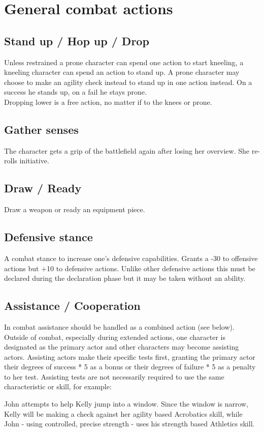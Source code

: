 \documentclass[12pt,a4paper,openany]{book}
\newenvironment{exampleblock}[1][1]
{\hfill\begin{minipage}{\dimexpr\textwidth-#1cm}}
{\end{minipage}\par}
\begin{document}
	\newpage
	\section{General combat actions}
	\subsection*{Stand up / Hop up / Drop}
	Unless restrained a prone character can spend one action to start kneeling, a kneeling character can spend an action to stand up. A prone character may choose to make an agility check instead to stand up in one action instead. On a success he stands up, on a fail he stays prone.\\
	Dropping lower is a free action, no matter if to the knees or prone.
	\subsection*{Gather senses}
	The character gets a grip of the battlefield again after losing her overview. She re-rolls initiative.
	\subsection*{Draw / Ready}
	Draw a weapon or ready an equipment piece.
	\subsection*{Defensive stance}
	A combat stance to increase one’s defensive capabilities. Grants a -30 to offensive actions but +10 to defensive actions. Unlike other defensive actions this must be declared during the declaration phase but it may be taken without an ability.
	\subsection*{Assistance / Cooperation}
	In combat assistance should be handled as a combined action (see below). Outside of combat, especially during extended actions, one character is designated as the primary actor and other characters may become assisting actors. Assisting actors make their specific tests first, granting the primary actor their degrees of success * 5 as a bonus or their degrees of failure * 5 as a penalty to her test. Assisting tests are not necessarily required to use the same characteristic or skill, for example:
	
	\begin{exampleblock}
		John attempts to help Kelly jump into a window. Since the window is narrow, Kelly will be making a check against her agility based Acrobatics skill, while John - using controlled, precise strength - uses his strength based Athletics skill.
	\end{exampleblock}
\end{document}
